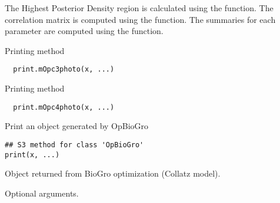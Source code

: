 \documentclass[letterpaper]{book}
\begin{document}
%
\begin{Details}\relax
The Highest Posterior Density region is calculated using
the  function.  The correlation
matrix is computed using the  function.
The summaries for each parameter are computed using the
 function.
\end{Details}
%
\begin{SeeAlso}\relax
{}
\end{SeeAlso}
%
\begin{Description}\relax
Printing method
\end{Description}
%
\begin{Usage}
\begin{verbatim}
  print.mOpc3photo(x, ...)
\end{verbatim}
\end{Usage}
%
\begin{Description}\relax
Printing method
\end{Description}
%
\begin{Usage}
\begin{verbatim}
  print.mOpc4photo(x, ...)
\end{verbatim}
\end{Usage}
%
\begin{Description}\relax
Print an object generated by OpBioGro
\end{Description}
%
\begin{Usage}
\begin{verbatim}
## S3 method for class 'OpBioGro'
print(x, ...)
\end{verbatim}
\end{Usage}
%
\begin{Arguments}
\begin{ldescription}
\item[\code{x}] 
Object returned from BioGro optimization
(Collatz model).

\item[\code{...}] 
Optional arguments. 

\end{ldescription}
\end{Arguments}
%
\begin{SeeAlso}\relax
\end{SeeAlso}
\end{document}
